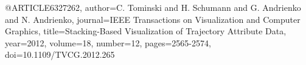 @ARTICLE{6327262,
  author={C. {Tominski} and H. {Schumann} and G. {Andrienko} and N. {Andrienko}},
  journal={IEEE Transactions on Visualization and Computer Graphics}, 
  title={Stacking-Based Visualization of Trajectory Attribute Data}, 
  year={2012},
  volume={18},
  number={12},
  pages={2565-2574},
  doi={10.1109/TVCG.2012.265}}